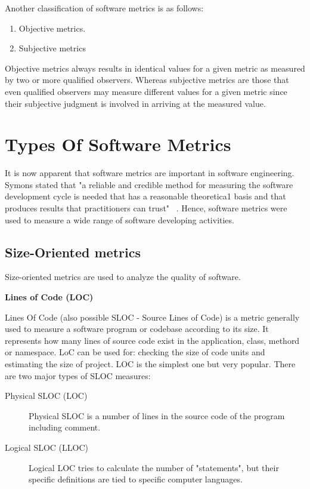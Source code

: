 Another classification of software metrics is as follows:

\begin{enumerate}
	\item Objective metrics.
	\item Subjective metrics
\end{enumerate}

Objective metrics always results in identical values for a given metric as measured by two or more qualified observers. Whereas subjective metrics are those that even qualified observers may measure different values for a given metric since their subjective judgment is involved in arriving at the measured value.

\section{Types Of Software Metrics}

It is now apparent that software metrics are important in software engineering. Symons stated that "a reliable and credible method for measuring the software development cycle is needed that has a reasonable theoretica1 basis and that produces results that practitioners can trust" ~\cite{symons}. Hence, software metrics were used to measure a wide range of software developing activities.

\subsection{Size-Oriented metrics}

Size-oriented metrics are used to analyze the quality of software.

\textbf{Lines of Code (LOC)}

Lines Of Code (also possible SLOC - Source Lines of Code) is a metric generally used to measure a software program or codebase according to its size. It represents how many lines of source
code exist in the application, class, methord or namespace. LoC can be used for: checking the size of code units and estimating the size of project. LOC is the simplest one but very popular.
There are two major types of SLOC measures: 

\begin{description}
	\item[Physical SLOC (LOC)] Physical SLOC is a number of lines in the source code of the program including comment.
	\item[Logical SLOC (LLOC)] Logical LOC tries to calculate the number of "statements", but their specific definitions are tied to specific computer languages.
\end{description}

